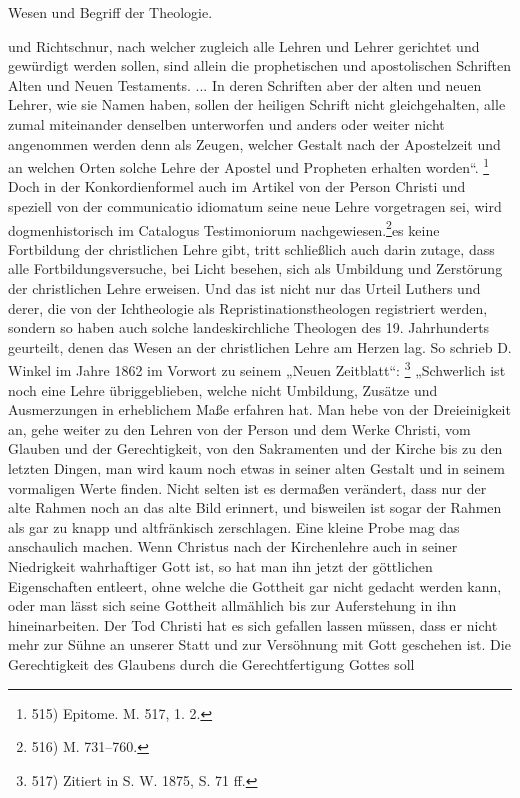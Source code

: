 \leavevmode{}\hfill Wesen und Begriff der Theologie.\par\bigskipRegel und Richtschnur, nach welcher zugleich alle Lehren und Lehrer gerichtet und gewürdigt werden sollen, sind allein die prophetischen und apostolischen Schriften Alten und Neuen Testaments. ... In deren Schriften aber der alten und neuen Lehrer, wie sie Namen haben, sollen der heiligen Schrift nicht gleichgehalten, alle zumal miteinander denselben unterworfen und anders oder weiter nicht angenommen werden denn als Zeugen, welcher Gestalt nach der Apostelzeit und an welchen Orten solche Lehre der Apostel und Propheten erhalten worden“. \footnote{515) Epitome. M. 517, 1. 2.} Doch in der Konkordienformel auch im Artikel von der Person Christi und speziell von der communicatio idiomatum seine neue Lehre vorgetragen sei, wird dogmenhistorisch im Catalogus Testimoniorum nachgewiesen.\footnote{516) M. 731--760.}\parDass es keine Fortbildung der christlichen Lehre gibt, tritt schließlich auch darin zutage, dass alle Fortbildungsversuche, bei Licht besehen, sich als Umbildung und Zerstörung der christlichen Lehre erweisen. Und das ist nicht nur das Urteil Luthers und derer, die von der Ichtheologie als Repristinationstheologen registriert werden, sondern so haben auch solche landeskirchliche Theologen des 19. Jahrhunderts geurteilt, denen das Wesen an der christlichen Lehre am Herzen lag. So schrieb D. Winkel im Jahre 1862 im Vorwort zu seinem „Neuen Zeitblatt“: \footnote{517) Zitiert in S. W. 1875, S. 71 ff.} „Schwerlich ist noch eine Lehre übriggeblieben, welche nicht Umbildung, Zusätze und Ausmerzungen in erheblichem Maße erfahren hat. Man hebe von der Dreieinigkeit an, gehe weiter zu den Lehren von der Person und dem Werke Christi, vom Glauben und der Gerechtigkeit, von den Sakramenten und der Kirche bis zu den letzten Dingen, man wird kaum noch etwas in seiner alten Gestalt und in seinem vormaligen Werte finden. Nicht selten ist es dermaßen verändert, dass nur der alte Rahmen noch an das alte Bild erinnert, und bisweilen ist sogar der Rahmen als gar zu knapp und altfränkisch zerschlagen. Eine kleine Probe mag das anschaulich machen. Wenn Christus nach der Kirchenlehre auch in seiner Niedrigkeit wahrhaftiger Gott ist, so hat man ihn jetzt der göttlichen Eigenschaften entleert, ohne welche die Gottheit gar nicht gedacht werden kann, oder man lässt sich seine Gottheit allmählich bis zur Auferstehung in ihn hineinarbeiten. Der Tod Christi hat es sich gefallen lassen müssen, dass er nicht mehr zur Sühne an unserer Statt und zur Versöhnung mit Gott geschehen ist. Die Gerechtigkeit des Glaubens durch die Gerechtfertigung Gottes soll